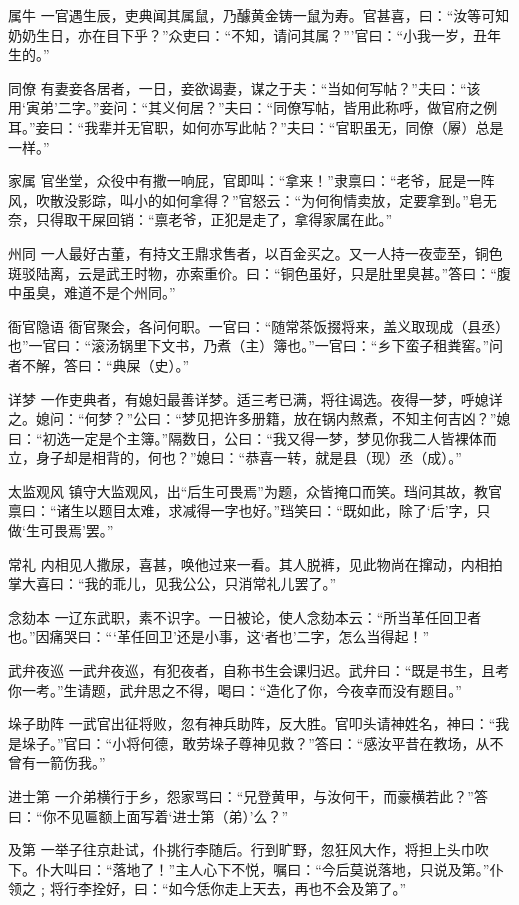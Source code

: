 \documentclass[12pt,UTF8]{ctexbook}
\begin{document}
属牛
一官遇生辰，吏典闻其属鼠，乃醵黄金铸一鼠为寿。官甚喜，曰：“汝等可知奶奶生日，亦在目下乎？”众吏曰：“不知，请问其属？”’官曰：“小我一岁，丑年生的。”

同僚
有妻妾各居者，一日，妾欲谒妻，谋之于夫：“当如何写帖？”夫曰：“该用‘寅弟’二字。”妾问：“其义何居？”夫曰：“同僚写帖，皆用此称呼，做官府之例耳。”妾曰：“我辈并无官职，如何亦写此帖？”夫曰：“官职虽无，同僚（屪）总是一样。”

家属
官坐堂，众役中有撒一响屁，官即叫：“拿来！”隶禀曰：“老爷，屁是一阵风，吹散没影踪，叫小的如何拿得？”官怒云：“为何徇情卖放，定要拿到。”皂无奈，只得取干屎回销：“禀老爷，正犯是走了，拿得家属在此。”

州同
一人最好古董，有持文王鼎求售者，以百金买之。又一人持一夜壶至，铜色斑驳陆离，云是武王时物，亦索重价。曰：“铜色虽好，只是肚里臭甚。”答曰：“腹中虽臭，难道不是个州同。”

衙官隐语
衙官聚会，各问何职。一官曰：“随常茶饭掇将来，盖义取现成（县丞）也”一官曰：“滚汤锅里下文书，乃煮（主）簿也。”一官曰：“乡下蛮子租粪窖。”问者不解，答曰：“典屎（史）。”

详梦
一作吏典者，有媳妇最善详梦。适三考已满，将往谒选。夜得一梦，呼媳详之。媳问：“何梦？”公曰：“梦见把许多册籍，放在锅内熬煮，不知主何吉凶？”媳曰：“初选一定是个主簿。”隔数日，公曰：“我又得一梦，梦见你我二人皆裸体而立，身子却是相背的，何也？”媳曰：“恭喜一转，就是县（现）丞（成）。”

太监观风
镇守大监观风，出“后生可畏焉”为题，众皆掩口而笑。珰问其故，教官禀曰：“诸生以题目太难，求减得一字也好。”珰笑曰：“既如此，除了‘后’字，只做‘生可畏焉’罢。”

常礼
内相见人撒尿，喜甚，唤他过来一看。其人脱裤，见此物尚在撺动，内相拍掌大喜曰：“我的乖儿，见我公公，只消常礼儿罢了。”

念劾本
一辽东武职，素不识字。一日被论，使人念劾本云：“所当革任回卫者也。”因痛哭曰：“‘革任回卫’还是小事，这‘者也’二字，怎么当得起！”

武弁夜巡
一武弁夜巡，有犯夜者，自称书生会课归迟。武弁曰：“既是书生，且考你一考。”生请题，武弁思之不得，喝曰：“造化了你，今夜幸而没有题目。”

垛子助阵
一武官出征将败，忽有神兵助阵，反大胜。官叩头请神姓名，神曰：“我是垛子。”官曰：“小将何德，敢劳垛子尊神见救？”答曰：“感汝平昔在教场，从不曾有一箭伤我。”

进士第
一介弟横行于乡，怨家骂曰：“兄登黄甲，与汝何干，而豪横若此？”答曰：“你不见匾额上面写着‘进士第（弟）’么？”

及第
一举子往京赴试，仆挑行李随后。行到旷野，忽狂风大作，将担上头巾吹下。仆大叫曰：“落地了！”主人心下不悦，嘱曰：“今后莫说落地，只说及第。”仆领之﹔将行李拴好，曰：“如今恁你走上天去，再也不会及第了。”
\end{document}
